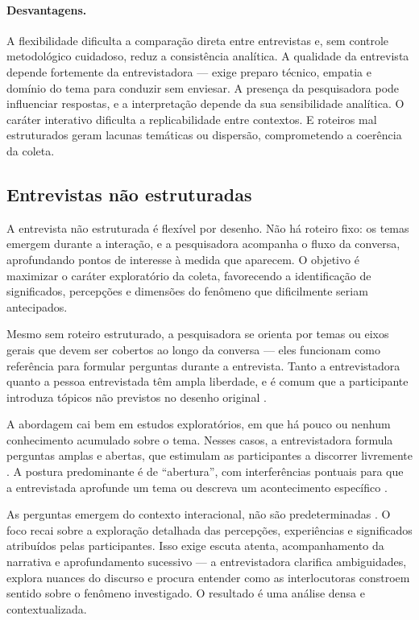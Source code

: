 \documentclass[12pt, a4paper, openany]{book}
\begin{document}
\paragraph{Desvantagens.} A flexibilidade dificulta a compara\c{c}\~ao direta entre entrevistas e, sem controle metodol\'ogico cuidadoso, reduz a consist\^encia anal\'itica. A qualidade da entrevista depende fortemente da entrevistadora --- exige preparo t\'ecnico, empatia e dom\'inio do tema para conduzir sem enviesar. A presen\c{c}a da pesquisadora pode influenciar respostas, e a interpreta\c{c}\~ao depende da sua sensibilidade anal\'itica. O car\'ater interativo dificulta a replicabilidade entre contextos. E roteiros mal estruturados geram lacunas tem\'aticas ou dispers\~ao, comprometendo a coer\^encia da coleta.

\subsection{Entrevistas n\~ao estruturadas}

A entrevista n\~ao estruturada \'e flex\'ivel por desenho. N\~ao h\'a roteiro fixo: os temas emergem durante a intera\c{c}\~ao, e a pesquisadora acompanha o fluxo da conversa, aprofundando pontos de interesse \`a medida que aparecem. O objetivo \'e maximizar o car\'ater explorat\'orio da coleta, favorecendo a identifica\c{c}\~ao de significados, percep\c{c}\~oes e dimens\~oes do fen\^omeno que dificilmente seriam antecipados.

Mesmo sem roteiro estruturado, a pesquisadora se orienta por temas ou eixos gerais que devem ser cobertos ao longo da conversa --- eles funcionam como refer\^encia para formular perguntas durante a entrevista. Tanto a entrevistadora quanto a pessoa entrevistada t\^em ampla liberdade, e \'e comum que a participante introduza t\'opicos n\~ao previstos no desenho original \citep{lima2016entrevistas}.

A abordagem cai bem em estudos explorat\'orios, em que h\'a pouco ou nenhum conhecimento acumulado sobre o tema. Nesses casos, a entrevistadora formula perguntas amplas e abertas, que estimulam as participantes a discorrer livremente \citep{silva2019aplicacao}. A postura predominante \'e de ``abertura'', com interfer\^encias pontuais para que a entrevistada aprofunde um tema ou descreva um acontecimento espec\'ifico \citep{fraser2004fala}.

As perguntas emergem do contexto interacional, n\~ao s\~ao predeterminadas \citep{jimenez2012entrevista}. O foco recai sobre a explora\c{c}\~ao detalhada das percep\c{c}\~oes, experi\^encias e significados atribu\'idos pelas participantes. Isso exige escuta atenta, acompanhamento da narrativa e aprofundamento sucessivo --- a entrevistadora clarifica ambiguidades, explora nuances do discurso e procura entender como as interlocutoras constroem sentido sobre o fen\^omeno investigado. O resultado \'e uma an\'alise densa e contextualizada.
\end{document}
